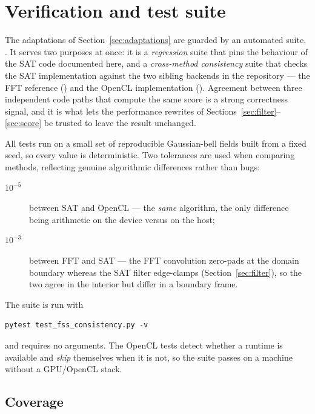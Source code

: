\section{Verification and test suite}
\label{sec:tests}

The adaptations of Section~\ref{sec:adaptations} are guarded by an automated
 suite, . It serves two
purposes at once: it is a \emph{regression} suite that pins the behaviour of the
SAT code documented here, and a \emph{cross-method consistency} suite that checks
the SAT implementation against the two sibling backends in the repository --- the
FFT reference () and the OpenCL implementation
(). Agreement between three independent code paths that
compute the same score is a strong correctness signal, and it is what lets the
performance rewrites of Sections~\ref{sec:filter}--\ref{sec:score} be trusted to
leave the result unchanged.

All tests run on a small set of reproducible Gaussian-bell fields built from a
fixed seed, so every value is deterministic. Two tolerances are used when
comparing methods, reflecting genuine algorithmic differences rather than bugs:

\begin{description}
  \item[$10^{-5}$] between SAT and OpenCL --- the \emph{same} algorithm, the only
        difference being  arithmetic on the device versus
         on the host;
  \item[$10^{-3}$] between FFT and SAT --- the FFT convolution zero-pads at the
        domain boundary whereas the SAT filter edge-clamps
        (Section~\ref{sec:filter}), so the two agree in the interior but differ
        in a boundary frame.
\end{description}

The suite is run with

{\begin{lstlisting}[style=bash]
pytest test_fss_consistency.py -v
\end{lstlisting}}

\noindent and requires no arguments. The OpenCL tests detect whether a
 runtime is available and \emph{skip} themselves when it is
not, so the suite passes on a machine without a GPU/OpenCL stack.

\subsection{Coverage}
\label{sec:tests-coverage}

